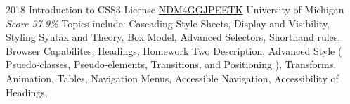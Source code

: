 \documentclass[11pt,a4paper]{moderncv}
\begin{document}
\cventry
    {2018}
    {Introduction to CSS3}
    {License
        \href{https://www.coursera.org/account/accomplishments/records/NDM4GGJPEETK}
        {NDM4GGJPEETK}
    }
    {University of Michigan}
    {\textit{Score 97.9\%}}
    {
        Topics include:                                                                                           %
            Cascading Style Sheets,                                                                               %
            Display and Visibility,                                                                               %
            Styling Syntax and Theory,                                                                            %
            Box Model,                                                                                            %
            Advanced Selectors,                                                                                   %
            Shorthand rules,                                                                                      %
            Browser Capabilites,                                                                                  %
            Headings,                                                                                             %
            Homework Two Description,                                                                             %
            Advanced Style (                                                                                      %
                Psuedo-classes,                                                                                   %
                Pseudo-elements,                                                                                  %
                Transitions,                                                                                      %
                and Positioning                                                                                   %
            ),                                                                                                    %
            Transforms,                                                                                           %
            Animation,                                                                                            %
            Tables,                                                                                               %
            Navigation Menus,                                                                                     %
            Accessible Navigation,                                                                                %
            Accessibility of Headings,                                                                            %
    }
\end{document}
